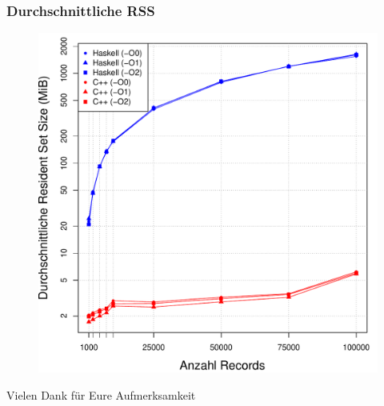 \documentclass[presentation, shownotes]{beamer}
\begin{document}
\begin{frame}
\frametitle{Durchschnittliche RSS}
    \begin{figure}
    \centering
    \includegraphics[height=.8\textheight]{average_rss_desktop.pdf}
    \end{figure}
\end{frame}

\begin{frame}
\centering
\Huge{Vielen Dank für Eure Aufmerksamkeit}
\end{frame}
\end{document}
